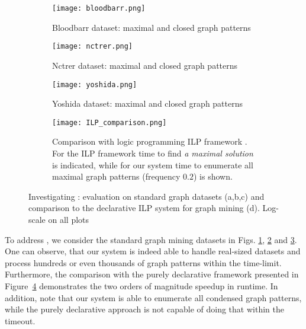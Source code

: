 \begin{figure}[tb]
  \centering
  \begin{subfigure}[t]{0.49\textwidth}
   \texttt{[image: bloodbarr.png]}
   \caption{Bloodbarr dataset: maximal and closed graph patterns}
    \label{fig:bloodbarr}
  \end{subfigure}
 \hfill
  \begin{subfigure}[t]{0.49\textwidth}
   \texttt{[image: nctrer.png]}
   \caption{Nctrer dataset: maximal and closed graph patterns}
    \label{fig:nctrer}
  \end{subfigure}
 \hfill
  \begin{subfigure}[t]{0.49\textwidth}
   \texttt{[image: yoshida.png]}
   \caption{Yoshida dataset: maximal and closed graph patterns}
    \label{fig:yoshida}
  \end{subfigure}
\hfill
  \begin{subfigure}[t]{0.49\textwidth}
   \texttt{[image: ILP\_comparison.png]}
   \caption{Comparison with logic programming ILP framework \parencite{query_mining_ilp}. For the ILP framework time to find \textit{a maximal solution} is indicated, while for our system  time to enumerate all maximal graph patterns (frequency $0.2$) is shown.}
   \label{fig:ilp_comparison}
  \end{subfigure}
  \label{fig:qfive}
  \caption{Investigating \qfive: evaluation on standard graph datasets (a,b,c) and comparison to the declarative ILP system for graph mining (d). Log-scale on all plots}
\end{figure}

To address \qfive, we consider the standard graph mining datasets 
in Figs. \ref{fig:bloodbarr}, \ref{fig:nctrer} and \ref{fig:yoshida}. One can observe, that our system is indeed able to handle real-sized datasets and process hundreds %
or even thousands of graph patterns within the time-limit. Furthermore, the comparison with the purely declarative framework presented in Figure~\ref{fig:ilp_comparison} %
demonstrates the two orders of magnitude speedup in runtime. In addition, note that our system is able to enumerate all condensed graph patterns, while the purely declarative approach is not capable of doing that within the timeout.

